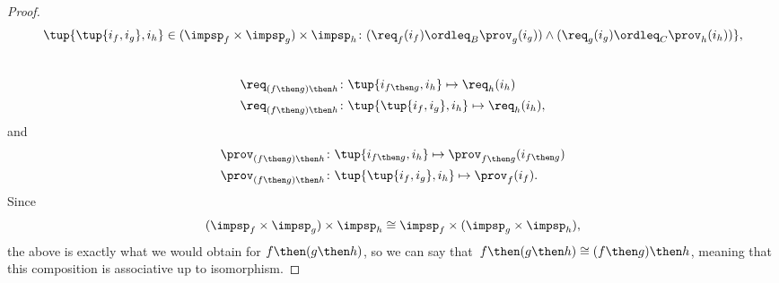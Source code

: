 \begin{proof}
\begin{equation}
\begin{aligned}
            \tup{\tup{i_f, i_g},i_h} \in (\impsp_f \times \impsp_g) \times \impsp_{h}\colon
            (\req_f(i_f) \ordleq_{B} \prov_g(i_g))
            \wedge
            (\req_g(i_g) \ordleq_{C} \prov_h(i_h))
            \},
        \end{aligned}
    \end{equation}
    ~
    \begin{equation}
        \begin{aligned}
            \req_{(f\then g)\then h}  &\colon  \tup{i_{f\then g},i_h} \mapsto \req_h(i_h) \\
            \req_{(f\then g)\then h}  &\colon  \tup{\tup{i_f, i_g},i_h} \mapsto \req_h(i_h),
        \end{aligned}
    \end{equation}
    and
    \begin{equation}
        \begin{aligned}
            \prov_{(f\then g)\then h}  &\colon  \tup{i_{f\then g},i_h} \mapsto \prov_{f\then g}(i_{f\then g})\\
            \prov_{(f\then g)\then h}  &\colon  \tup{\tup{i_f, i_g},i_h} \mapsto \prov_f(i_f).
        \end{aligned}
    \end{equation}
    Since
    \begin{equation}
    (\impsp_f \times \impsp_g)
        \times \impsp_{h} \cong  \impsp_f \times (\impsp_g \times \impsp_{h}),
    \end{equation}
    the above is exactly what we would obtain for $f\then (g\then h)$, so we can say
    that~$f\then(g\then h)\cong (f\then g)\then h$, meaning that this composition is associative up to isomorphism.
\end{proof}

